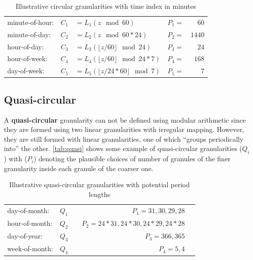 \documentclass[12pt]{article}
\begin{document}
\begin{table}[ht]
\begin{center}
\begin{tabular}{lr@{~}lr@{~}r}
\toprule
minute-of-hour: & $C_1$ & $= L_1(z \mod 60)$ & $P_1 =$&$60$ \\
minute-of-day: & $C_2$ & $= L_2(z \mod 60*24)$ & $P_2=$&$1440$\\
hour-of-day: & $C_3$ & $= L_3(\lfloor z/60\rfloor\mod 24)$  & $P_3 =$&$24$ \\
hour-of-week: & $C_4$ & $= L_4(\lfloor z/60\rfloor\mod 24*7)$  & $P_4=$&$168$\\
day-of-week: & $C_5$ & $= L_5(\lfloor z/24*60\rfloor \mod 7)$ & $P_5=$&$7$\\
\bottomrule
\end{tabular}
\end{center}
\caption{Illustrative circular granularities with time index in minutes}
\label{tab:definitions}
\end{table}

\hypertarget{sec:quasi-circular-gran-def}{%
\subsection{Quasi-circular}\label{sec:quasi-circular-gran-def}}

A \textbf{quasi-circular} granularity can not be defined using modular arithmetic since they are formed using two linear granularities with irregular mapping. However, they are still formed with linear granularities, one of which ``groups periodically into'' the other. \autoref{tab:quasi} shows some example of quasi-circular granularities (\(Q_i\)) with (\(P_i\)) denoting the plausible choices of number of granules of the finer granularity inside each granule of the coarser one.

\begin{table}[ht]
\begin{center}
\begin{tabular}{lr@{~}lr@{~}r}
\toprule

day-of-month: & $Q_1$ && $P_1 = 31, 30, 29, 28$\\
hour-of-month: & $Q_2$ && $P_2 = 24*31, 24*30, 24*29, 24*28$\\
day-of-year: & $Q_3$ && $P_3 = 366, 365$\\
week-of-month: & $Q_4$ && $P_4 = 5, 4$\\
\bottomrule
\end{tabular}
\end{center}
\caption{Illustrative quasi-circular granularities with potential period lengths}
\label{tab:quasi}
\end{table}
\end{document}
